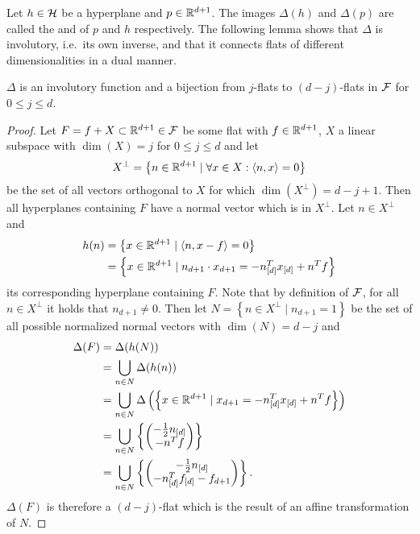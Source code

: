 Let $h \in \mathcal{H}$ be a hyperplane and $p \in \mathbb{R}^{d+1}$. The images $\Delta(h)$ and $\Delta(p)$ are called the  and  of $p$ and $h$ respectively.
The following lemma shows that $\Delta$ is involutory, i.e.~its own inverse, and that it connects flats of different dimensionalities in a dual manner.
\begin{lemma}
    \label{lem:deltainvolutory}
    $\Delta$ is an involutory function and a bijection from $j$-flats to $(d-j)$-flats in $\mathcal{F}$ for $0 \leq j \leq d$.
\end{lemma}
\begin{proof}
    Let $F = f + X \subset \mathbb{R}^{d+1} \in \mathcal{F}$ be some flat with $f \in \mathbb{R}^{d+1}$, $X$ a linear subspace with $\dim(X) = j$ for $0 \leq j \leq d$ and let
    \begin{align}
        X^\bot = \left\{ n \in \mathbb{R}^{d+1} \mid \forall x \in X : \left\langle n, x \right\rangle = 0 \right\}
    \end{align}
    be the set of all vectors orthogonal to $X$ for which $\dim(X^\bot) = d - j + 1$.
    Then all hyperplanes containing $F$ have a normal vector which is in $X^\bot$.
    Let $n \in X^\bot$ and
    \begin{align}
        h(n) &= \left\{x \in \mathbb{R}^{d+1} \mid \left\langle n, x - f \right\rangle = 0\right\}\\
        &= \left\{ x \in \mathbb{R}^{d+1} \mid n_{d+1} \cdot x_{d+1} = -n_{[d]}^Tx_{[d]} + n^Tf \right\}
    \end{align}
    its corresponding hyperplane containing $F$.
    Note that by definition of $\mathcal{F}$, for all $n \in X^\bot$ it holds that $n_{d+1} \neq 0$.
    Then let $N = \left\{ n \in X^\bot \mid n_{d+1} = 1 \right\}$ be the set of all possible normalized normal vectors with $\dim(N) = d - j$ and
    \begin{align}
        \Delta(F) &= \Delta(h(N))\\
        &= \bigcup_{n \in N} \Delta(h(n)) \\
        &= \bigcup_{n \in N} \Delta \left( \left\{ x \in \mathbb{R}^{d+1} \mid x_{d+1} = -n_{[d]}^Tx_{[d]} + n^Tf \right\} \right) \\
        &= \bigcup_{n \in N} \left\{ \begin{pmatrix} -\frac{1}{2} n_{[d]}\\ - n^T f \end{pmatrix} \right\} \\
        &= \bigcup_{n \in N} \left\{ \begin{pmatrix} -\frac{1}{2} n_{[d]}\\ - n_{[d]}^T f_{[d]} - f_{d+1} \end{pmatrix} \right\}.
    \end{align}
    $\Delta(F)$ is therefore a $(d - j)$-flat which is the result of an affine transformation of $N$.


\end{proof}
